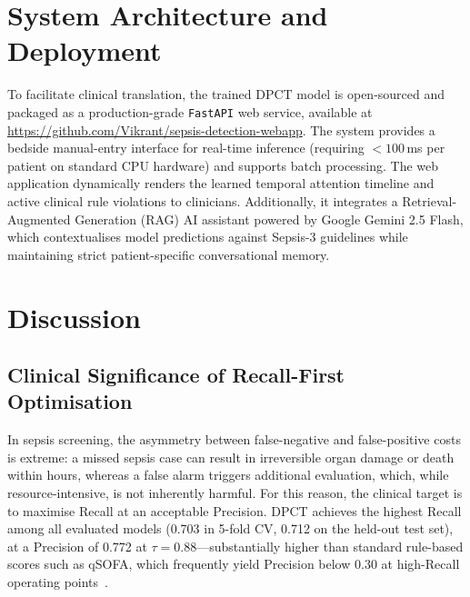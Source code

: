 \documentclass[conference,12pt]{IEEEtran}
\newcommand{\dpct}{\textsc{DPCT}}
\begin{document}
\section{\textbf{System Architecture and Deployment}}
\label{sec:system}

To facilitate clinical translation, the trained \dpct{} model is open-sourced and packaged as a production-grade \texttt{FastAPI} web service, available at \url{https://github.com/Vikrant/sepsis-detection-webapp}. The system provides a bedside manual-entry interface for real-time inference (requiring $<100$\,ms per patient on standard CPU hardware) and supports batch processing. The web application dynamically renders the learned temporal attention timeline and active clinical rule violations to clinicians. Additionally, it integrates a Retrieval-Augmented Generation (RAG) AI assistant powered by Google Gemini 2.5 Flash, which contextualises model predictions against Sepsis-3 guidelines while maintaining strict patient-specific conversational memory.

\section{\textbf{Discussion}}
\label{sec:discussion}

\subsection{\textbf{Clinical Significance of Recall-First Optimisation}}
\label{sec:disc:recall}

In sepsis screening, the asymmetry between false-negative and false-positive
costs is extreme: a missed sepsis case can result in irreversible organ damage
or death within hours, whereas a false alarm triggers additional evaluation,
which, while resource-intensive, is not inherently harmful.
For this reason, the clinical target is to maximise Recall at an acceptable
Precision.
\dpct{} achieves the highest Recall among all evaluated models
(0.703 in 5-fold CV, 0.712 on the held-out test set), at a Precision of 0.772
at $\tau = 0.88$---substantially higher than standard rule-based scores such as
qSOFA, which frequently yield Precision below 0.30 at high-Recall operating
points~\cite{serafim2018}.
\end{document}
